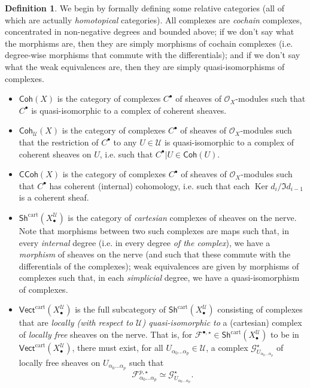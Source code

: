 \documentclass[11pt,fleqn]{article}
\theoremstyle{plain}
\theoremstyle{definition}
\newtheorem{definition}[theorem]{Definition}
\theoremstyle{remark}
\numberwithin{equation}{theorem}
\newcommand{\cover}{\mathcal{U}}
\newcommand{\OO}{\mathcal{O}}
\newcommand{\anotherbullet}{\star}
\newcommand{\gcohX}{\mathsf{Coh}(X)}
\newcommand{\gcohUX}{\mathsf{Coh}_{\cover}(X)}
\newcommand{\gccohX}{\mathsf{CCoh}(X)}
\newcommand{\cartvectX}{\mathsf{Vect}^\mathrm{cart}(X_\bullet^\cover)}
\newcommand{\cartshX}{\mathsf{Sh}^\mathrm{cart}(X_\bullet^\cover)}
\DeclareMathOperator{\Ker}{Ker}
\begin{document}
        \begin{definition}
            We begin by formally defining some relative categories (all of which are actually \emph{homotopical} categories).
            All complexes are \emph{cochain} complexes, concentrated in non-negative degrees and bounded above; if we don't say what the morphisms are, then they are simply morphisms of cochain complexes (i.e. degree-wise morphisms that commute with the differentials); and if we don't say what the weak equivalences are, then they are simply quasi-isomorphisms of complexes.
            \begin{itemize}
                \item $\gcohX$ is the category of complexes $C^\bullet$ of sheaves of $\OO_X$-modules such that $C^\bullet$ is quasi-isomorphic to a complex of coherent sheaves.
                \item $\gcohUX$ is the category of complexes $C^\bullet$ of sheaves of $\OO_X$-modules such that the restriction of $C^\bullet$ to any $U\in\cover$ is quasi-isomorphic to a complex of coherent sheaves on $U$, i.e. such that $C^\bullet|U\in\mathsf{Coh}(U)$.
                \item $\gccohX$ is the category of complexes $C^\bullet$ of sheaves of $\OO_X$-modules such that $C^\bullet$ has coherent (internal) cohomology, i.e. such that each $\Ker d_{i}/\Im d_{i-1}$ is a coherent sheaf.
                \item $\cartshX$ is the category of \emph{cartesian} complexes of sheaves on the nerve.
                    Note that morphisms between two such complexes are maps such that, in every \emph{internal} degree (i.e. in every degree \emph{of the complex}), we have a \emph{morphism} of sheaves on the nerve (and such that these commute with the differentials of the complexes); weak equivalences are given by morphisms of complexes such that, in each \emph{simplicial} degree, we have a quasi-isomorphism of complexes.
                \item $\cartvectX$ is the full subcategory of $\cartshX$ consisting of complexes that are \emph{locally (with respect to $\cover$) quasi-isomorphic to} a (cartesian) complex of \emph{locally free} sheaves on the nerve.
                    That is, for $\mathcal{F}^{\bullet,\anotherbullet}\in\cartshX$ to be in $\cartvectX$, there must exist, for all $U_{\alpha_0\ldots\alpha_p}\in\cover$, a complex $\mathcal{G}_{U_{\alpha_0\ldots\alpha_p}}^{\anotherbullet}$ of {locally free} sheaves on $U_{\alpha_0\ldots\alpha_p}$ such that \[\mathcal{F}^{p,\anotherbullet}_{\alpha_0\ldots\alpha_p} \simeq \mathcal{G}_{U_{\alpha_0\ldots\alpha_p}}^\anotherbullet.\]

\end{itemize}
\end{definition}
\end{document}
